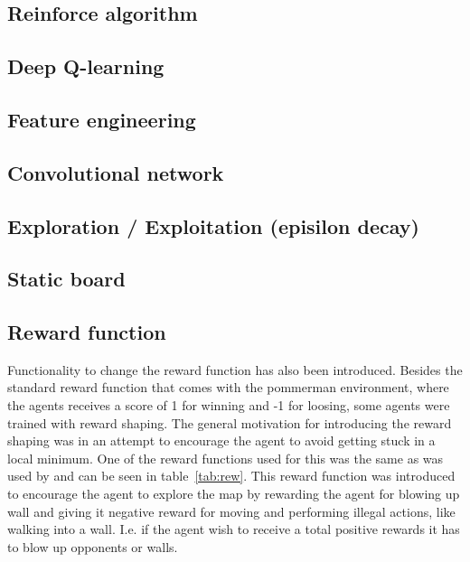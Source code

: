
\subsection{Reinforce algorithm}

\subsection{Deep Q-learning}

\subsection{Feature engineering}

\subsection{Convolutional network}

\subsection{Exploration / Exploitation (episilon decay)}

\subsection{Static board}

\subsection{Reward function}
Functionality to change the reward function has also been introduced. Besides the standard reward function that comes with the pommerman environment, where the agents receives a score of 1 for winning and -1 for loosing, some agents were trained with reward shaping. The general motivation for introducing the reward shaping was in an attempt to encourage the agent to avoid getting stuck in a local minimum. One of the reward functions used for this was the same as was used by \cite{kormelink2018exploration} and can be seen in table~\ref{tab:rew}. This reward function was introduced to encourage the agent to explore the map by rewarding the agent for blowing up wall and giving it negative reward for moving and performing illegal actions, like walking into a wall. I.e. if the agent wish to receive a total positive rewards it has to blow up opponents or walls.

